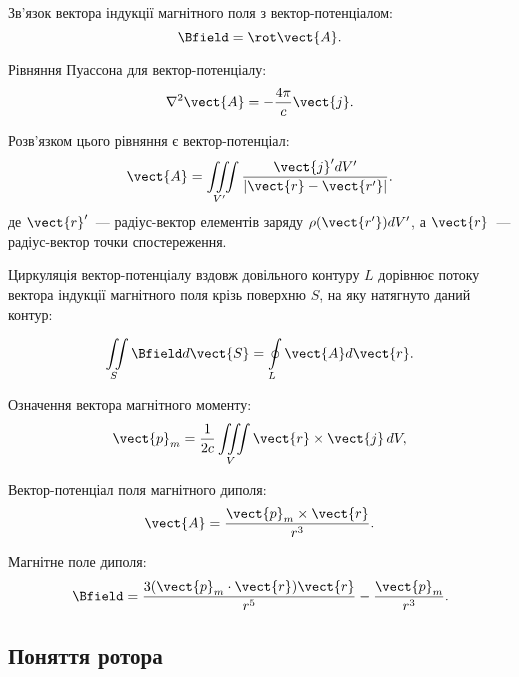 \begin{Theory}\small
  Зв'язок вектора індукції магнітного поля з вектор-потенціалом:
  \begin{equation}\label{BrotA}
	  \Bfield = \rot\vect{A}.
  \end{equation}

  Рівняння Пуассона для вектор-потенціалу:
  \begin{equation}
	  \nabla^2\vect{A} = - \frac{4\pi}{c}\vect{j}.
  \end{equation}

  Розв'язком цього рівняння є вектор-потенціал:
  \begin{equation}\label{Supperposition_principle}
	  \vect{A}  = \iiint\limits_{V'} \frac{\vect{j}' dV'}{\left| \vect{r} - \vect{r'} \right|}.
  \end{equation}
  де $\vect{r}'$~--- радіус-вектор елементів заряду $\rho(\vect{r'}) dV'$, а $\vect{r}$~--- радіус-вектор точки спостереження.

	Циркуляція вектор-потенціалу вздовж довільного контуру $L$ дорівнює потоку вектора індукції магнітного поля крізь поверхню $S$, на яку натягнуто даний контур:

  \begin{equation}\label{Bflux_is_circulating_potential}
	  \iint\limits_S \Bfield d\vect{S} = \oint\limits_L \vect{A} d\vect{r}.
  \end{equation}

  Означення вектора магнітного моменту:
  \begin{equation}\label{mag_momentum}
	  \vect{p}_m = \frac{1}{2c} \iiint\limits_V \vect{r}\times\vect{j}\,dV,
  \end{equation}

  Вектор-потенціал поля магнітного диполя:
  \begin{equation}\label{dipole_vect_potential}
	  \vect{A} = \frac{\vect{p}_m\times \vect{r} }{r^3}.
  \end{equation}

  Магнітне поле диполя:
  \begin{equation}\label{dipole_Bfield}
	  \Bfield = \frac{3(\vect{p}_m\cdot\vect{r})\vect{r}}{r^5} - \frac{\vect{p}_m}{r^3}.
  \end{equation}
\end{Theory}

\subsection*{Поняття ротора}

